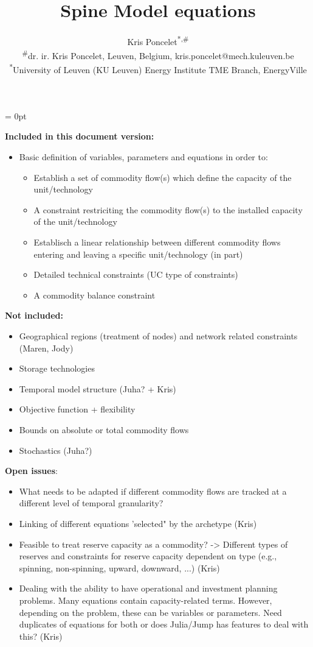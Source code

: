 \documentclass[10pt,english]{article}
\title{Spine Model equations}
\date{}
\author{Kris Poncelet\textsuperscript{*,\#}\\ 
{\small \textsuperscript{\#}dr. ir. Kris Poncelet, Leuven, Belgium, kris.poncelet@mech.kuleuven.be} \\
{\small \textsuperscript{*}University of Leuven (KU Leuven) Energy Institute TME Branch, EnergyVille}}
\begin{document}
\voffset = 0pt

\maketitle{}


\textbf{Included in this document version:}
\begin{itemize}
\item Basic definition of variables, parameters and equations in order to:
\begin{itemize}
\item Establish a set of commodity flow(s) which define the capacity of the unit/technology 
\item A constraint restriciting the commodity flow(s) to the installed capacity of the unit/technology
\item Establisch a linear relationship between different commodity flows entering and leaving a specific unit/technology (in part)
\item Detailed technical constraints (UC type of constraints)
\item A commodity balance constraint
\end{itemize} 
\end{itemize} 


\textbf{Not included:}
\begin{itemize}
\item Geographical regions (treatment of nodes) and network related constraints (Maren, Jody)
\item Storage technologies
\item Temporal model structure (Juha? + Kris)
\item Objective function + flexibility
\item Bounds on absolute or total commodity flows
\item Stochastics (Juha?)
\end{itemize} 

\textbf{Open issues}: 
\begin{itemize}
\item What needs to be adapted if different commodity flows are tracked at a different level of temporal granularity?
\item Linking of different equations 'selected" by the archetype (Kris)
\item Feasible to treat reserve capacity as a commodity? -> Different types of reserves and constraints for reserve capacity dependent on type (e.g., spinning, non-spinning, upward, downward, ...) (Kris)
\item Dealing with the ability to have operational and investment planning problems. Many equations contain capacity-related terms. However, depending on the problem, these can be variables or parameters. Need duplicates of equations for both or does Julia/Jump has features to deal with this? (Kris)
\end{itemize}
\end{document}
